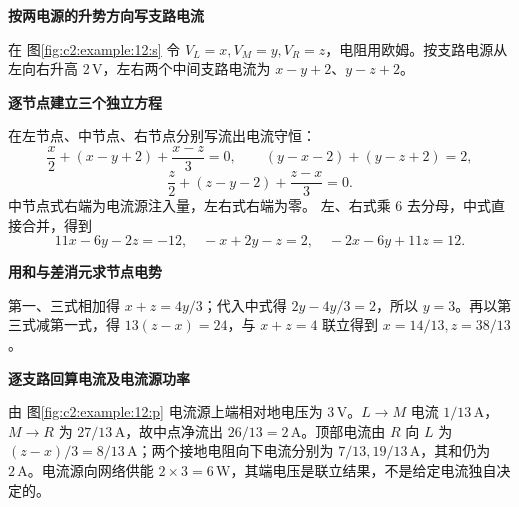 \begin{solution}\textbf{按两电源的升势方向写支路电流}\par\nobreak
在 图\ref{fig:c2:example:12:s} 令 $V_L=x,V_M=y,V_R=z$，电阻用欧姆。按支路电源从左向右升高 $2\,\mathrm V$，左右两个中间支路电流为 $x-y+2$、$y-z+2$。

\par\medskip{}\noindent\textbf{逐节点建立三个独立方程}\par\nobreak
在左节点、中节点、右节点分别写流出电流守恒：
\[
 \frac x2+(x-y+2)+\frac{x-z}{3}=0,\qquad
 (y-x-2)+(y-z+2)=2,
\]
\[
 \frac z2+(z-y-2)+\frac{z-x}{3}=0.
\]
中节点式右端为电流源注入量，左右式右端为零。
左、右式乘 $6$ 去分母，中式直接合并，得到
\[
 11x-6y-2z=-12,\quad -x+2y-z=2,\quad -2x-6y+11z=12.
\]


\par\medskip{}\noindent\textbf{用和与差消元求节点电势}\par\nobreak
第一、三式相加得 $x+z=4y/3$；代入中式得 $2y-4y/3=2$，所以 $y=3$。再以第三式减第一式，得 $13(z-x)=24$，与 $x+z=4$ 联立得到 $x=14/13,z=38/13$。



\par\medskip{}\noindent\textbf{逐支路回算电流及电流源功率}\par\nobreak
由 图\ref{fig:c2:example:12:p} 电流源上端相对地电压为 $3\,\mathrm V$。$L\to M$ 电流 $1/13\,\mathrm A$，$M\to R$ 为 $27/13\,\mathrm A$，故中点净流出 $26/13=2\,\mathrm A$。顶部电流由 $R$ 向 $L$ 为 $(z-x)/3=8/13\,\mathrm A$；两个接地电阻向下电流分别为 $7/13,19/13\,\mathrm A$，其和仍为 $2\,\mathrm A$。电流源向网络供能 $2\times3=6\,\mathrm W$，其端电压是联立结果，不是给定电流独自决定的。\end{solution}
